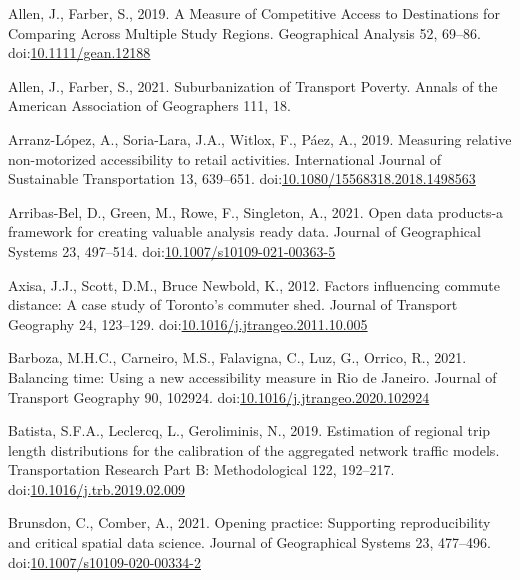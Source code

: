 \documentclass[]{elsarticle} %
\newlength{\cslhangindent}
\newlength{\cslentryspacingunit} %
\newenvironment{CSLReferences}[2] %
 {%
  \setlength{\parindent}{0pt}
  \ifodd #1
  \let\oldpar\par
  \def\par{\hangindent=\cslhangindent\oldpar}
  \fi
  \setlength{\parskip}{#2\cslentryspacingunit}
 }%
 {}
\begin{document}
\hypertarget{refs}{}
\begin{CSLReferences}{1}{0}
\leavevmode{}%
Allen, J., Farber, S., 2019. A Measure of Competitive Access to
Destinations for Comparing Across Multiple Study Regions. Geographical
Analysis 52, 69--86.
doi:\href{https://doi.org/10.1111/gean.12188}{10.1111/gean.12188}

\leavevmode{}%
Allen, J., Farber, S., 2021. Suburbanization of {Transport} {Poverty}.
Annals of the American Association of Geographers 111, 18.

\leavevmode{}%
Arranz-López, A., Soria-Lara, J.A., Witlox, F., Páez, A., 2019.
Measuring relative non-motorized accessibility to retail activities.
International Journal of Sustainable Transportation 13, 639--651.
doi:\href{https://doi.org/10.1080/15568318.2018.1498563}{10.1080/15568318.2018.1498563}

\leavevmode{}%
Arribas-Bel, D., Green, M., Rowe, F., Singleton, A., 2021. Open data
products-a framework for creating valuable analysis ready data. Journal
of Geographical Systems 23, 497--514.
doi:\href{https://doi.org/10.1007/s10109-021-00363-5}{10.1007/s10109-021-00363-5}

\leavevmode{}%
Axisa, J.J., Scott, D.M., Bruce Newbold, K., 2012. Factors influencing
commute distance: A case study of {Toronto}'s commuter shed. Journal of
Transport Geography 24, 123--129.
doi:\href{https://doi.org/10.1016/j.jtrangeo.2011.10.005}{10.1016/j.jtrangeo.2011.10.005}

\leavevmode{}%
Barboza, M.H.C., Carneiro, M.S., Falavigna, C., Luz, G., Orrico, R.,
2021. Balancing time: {Using} a new accessibility measure in {Rio} de
{Janeiro}. Journal of Transport Geography 90, 102924.
doi:\href{https://doi.org/10.1016/j.jtrangeo.2020.102924}{10.1016/j.jtrangeo.2020.102924}

\leavevmode{}%
Batista, S.F.A., Leclercq, L., Geroliminis, N., 2019. Estimation of
regional trip length distributions for the calibration of the aggregated
network traffic models. Transportation Research Part B: Methodological
122, 192--217.
doi:\href{https://doi.org/10.1016/j.trb.2019.02.009}{10.1016/j.trb.2019.02.009}

\leavevmode{}%
Brunsdon, C., Comber, A., 2021. Opening practice: Supporting
reproducibility and critical spatial data science. Journal of
Geographical Systems 23, 477--496.
doi:\href{https://doi.org/10.1007/s10109-020-00334-2}{10.1007/s10109-020-00334-2}


\end{CSLReferences}
\end{document}
